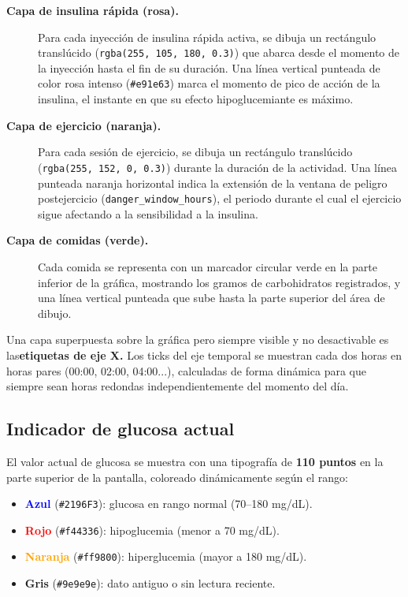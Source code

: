 \begin{description}
    \item[\textbf{Capa de insulina rápida (rosa).}] Para cada inyección de insulina
    rápida activa, se dibuja un rectángulo translúcido (\texttt{rgba(255, 105, 180, 0.3)})
    que abarca desde el momento de la inyección hasta el fin de su duración. Una línea
    vertical punteada de color rosa intenso (\texttt{\#e91e63}) marca el momento de
    pico de acción de la insulina, el instante en que su efecto hipoglucemiante es
    máximo.

    \item[\textbf{Capa de ejercicio (naranja).}] Para cada sesión de ejercicio, se
    dibuja un rectángulo translúcido (\texttt{rgba(255, 152, 0, 0.3)}) durante la
    duración de la actividad. Una línea punteada naranja horizontal indica la
    extensión de la ventana de peligro postejercicio (\texttt{danger\_window\_hours}),
    el periodo durante el cual el ejercicio sigue afectando a la sensibilidad a la
    insulina.

    \item[\textbf{Capa de comidas (verde).}] Cada comida se representa con un
    marcador circular verde en la parte inferior de la gráfica, mostrando los gramos
    de carbohidratos registrados, y una línea vertical punteada que sube hasta la
    parte superior del área de dibujo.


\end{description}

Una capa superpuesta sobre la gráfica pero siempre visible y no desactivable es las\textbf{etiquetas de eje X.} Los ticks del eje temporal se muestran cada
    dos horas en horas pares (00:00, 02:00, 04:00...), calculadas de forma dinámica
    para que siempre sean horas redondas independientemente del momento del día.

\subsection{Indicador de glucosa actual}
\label{subsec:indicador-glucosa}

El valor actual de glucosa se muestra con una tipografía de \textbf{110 puntos} en la
parte superior de la pantalla, coloreado dinámicamente según el rango:

\begin{itemize}
    \item \textcolor{blue}{\textbf{Azul}} (\texttt{\#2196F3}): glucosa en rango normal (70--180 mg/dL).
    \item \textcolor{red}{\textbf{Rojo}} (\texttt{\#f44336}): hipoglucemia (menor a 70 mg/dL).
    \item \textcolor{orange}{\textbf{Naranja}} (\texttt{\#ff9800}): hiperglucemia (mayor a 180 mg/dL).
    \item \textbf{Gris} (\texttt{\#9e9e9e}): dato antiguo o sin lectura reciente.
\end{itemize}

